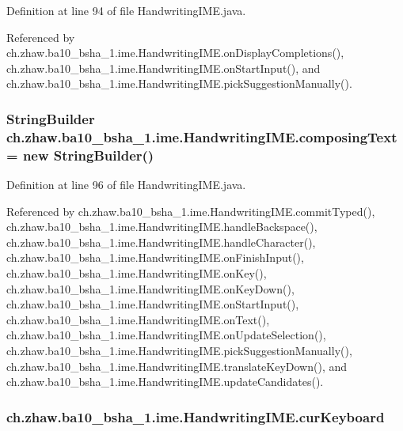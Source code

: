 Definition at line 94 of file HandwritingIME.java.

Referenced by ch.zhaw.ba10\_\-bsha\_\-1.ime.HandwritingIME.onDisplayCompletions(), ch.zhaw.ba10\_\-bsha\_\-1.ime.HandwritingIME.onStartInput(), and ch.zhaw.ba10\_\-bsha\_\-1.ime.HandwritingIME.pickSuggestionManually().\hypertarget{classch_1_1zhaw_1_1ba10__bsha__1_1_1ime_1_1HandwritingIME_adb09682281dc4daa50613d97d28c6dfd}{
\subsubsection[{composingText}]{\setlength{\rightskip}{0pt plus 5cm}StringBuilder {\bf ch.zhaw.ba10\_\-bsha\_\-1.ime.HandwritingIME.composingText} = new StringBuilder()}}
\label{classch_1_1zhaw_1_1ba10__bsha__1_1_1ime_1_1HandwritingIME_adb09682281dc4daa50613d97d28c6dfd}


Definition at line 96 of file HandwritingIME.java.

Referenced by ch.zhaw.ba10\_\-bsha\_\-1.ime.HandwritingIME.commitTyped(), ch.zhaw.ba10\_\-bsha\_\-1.ime.HandwritingIME.handleBackspace(), ch.zhaw.ba10\_\-bsha\_\-1.ime.HandwritingIME.handleCharacter(), ch.zhaw.ba10\_\-bsha\_\-1.ime.HandwritingIME.onFinishInput(), ch.zhaw.ba10\_\-bsha\_\-1.ime.HandwritingIME.onKey(), ch.zhaw.ba10\_\-bsha\_\-1.ime.HandwritingIME.onKeyDown(), ch.zhaw.ba10\_\-bsha\_\-1.ime.HandwritingIME.onStartInput(), ch.zhaw.ba10\_\-bsha\_\-1.ime.HandwritingIME.onText(), ch.zhaw.ba10\_\-bsha\_\-1.ime.HandwritingIME.onUpdateSelection(), ch.zhaw.ba10\_\-bsha\_\-1.ime.HandwritingIME.pickSuggestionManually(), ch.zhaw.ba10\_\-bsha\_\-1.ime.HandwritingIME.translateKeyDown(), and ch.zhaw.ba10\_\-bsha\_\-1.ime.HandwritingIME.updateCandidates().\hypertarget{classch_1_1zhaw_1_1ba10__bsha__1_1_1ime_1_1HandwritingIME_ac95c3e131d61264247ea2f40b3bd4991}{
\subsubsection[{curKeyboard}]{ {\bf ch.zhaw.ba10\_\-bsha\_\-1.ime.HandwritingIME.curKeyboard}}}
\label{classch_1_1zhaw_1_1ba10__bsha__1_1_1ime_1_1HandwritingIME_ac95c3e131d61264247ea2f40b3bd4991}


